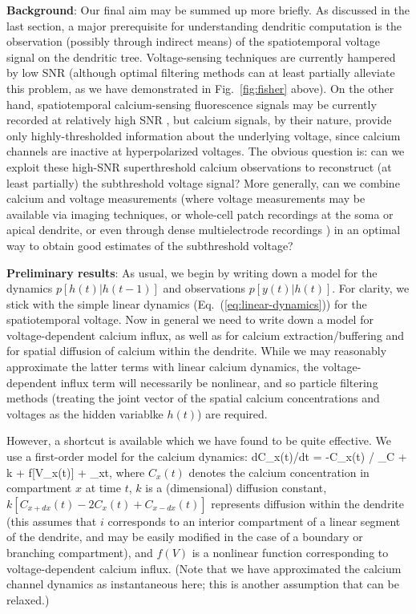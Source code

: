\documentclass[12pt]{article}
\begin{document}
\noindent \textbf{Background}: Our final aim may be summed up more
briefly.  As discussed in the last section, a major prerequisite for
understanding dendritic computation is the observation (possibly
through indirect means) of the spatiotemporal voltage signal on the
dendritic tree.  Voltage-sensing techniques are currently hampered by
low SNR (although optimal filtering methods can at least partially
alleviate this problem, as we have demonstrated in
Fig.~\ref{fig:fisher} above).  On the other hand, spatiotemporal
calcium-sensing fluorescence signals may be currently recorded at
relatively high SNR \cite{Gobel07,Larkum08}, but calcium signals, by
their nature, provide only highly-thresholded information about the
underlying voltage, since calcium channels are inactive at
hyperpolarized voltages.  The obvious question is: can we exploit
these high-SNR superthreshold calcium observations to reconstruct (at
least partially) the subthreshold voltage signal?  More generally, can
we combine calcium and voltage measurements (where voltage
measurements may be available via imaging techniques, or whole-cell
patch recordings at the soma or apical dendrite, or even through dense
multielectrode recordings \cite{Petrusca07}) in an optimal way to
obtain good estimates of the subthreshold voltage?

\noindent \textbf{Preliminary results}: As usual, we begin by writing
down a model for the dynamics $p[h(t)|h(t-1)]$ and observations
$p[y(t)|h(t)]$.  For clarity, we stick with the simple linear dynamics
(Eq.~(\ref{eq:linear-dynamics})) for the spatiotemporal voltage.  Now
in general we need to write down a model for voltage-dependent calcium
influx, as well as for calcium extraction/buffering and for spatial
diffusion of calcium within the dendrite.  While we may reasonably
approximate the latter terms with linear calcium dynamics, the
voltage-dependent influx term will necessarily be nonlinear, and so
particle filtering methods (treating the joint vector of the spatial
calcium concentrations and voltages as the hidden variablke $h(t)$)
are required.  

However, a shortcut is available which we have found to be quite
effective.  We use a first-order model for the calcium dynamics: \eq
dC_x(t)/dt = -C_x(t) / \tau_C + k \left[C_{x+dx}(t) -2C_x(t)
+C_{x-dx}(t) \right] + f[V_x(t)] + \epsilon_{xt}, \en where $C_x(t)$
denotes the calcium concentration in compartment $x$ at time $t$, $k$
is a (dimensional) diffusion constant, $k \left[C_{x+dx}(t) -2C_x(t)
+C_{x-dx}(t) \right]$ represents diffusion within the dendrite (this
assumes that $i$ corresponds to an interior compartment of a linear
segment of the dendrite, and may be easily modified in the case of a
boundary or branching compartment), and $f(V)$ is a nonlinear function
corresponding to voltage-dependent calcium influx.  (Note that we have
approximated the calcium channel dynamics as instantaneous here; this
is another assumption that can be relaxed.)
\end{document}
